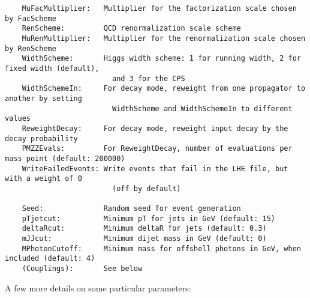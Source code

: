 \documentclass[aps,superscriptaddress,nofootinbib]{revtex4}
\begin{document}
\begin{verbatim}
    MuFacMultiplier:   Multiplier for the factorization scale chosen by FacScheme
    RenScheme:         QCD renormalization scale scheme
    MuRenMultiplier:   Multiplier for the renormalization scale chosen by RenScheme
    WidthScheme:       Higgs width scheme: 1 for running width, 2 for fixed width (default),
                         and 3 for the CPS
    WidthSchemeIn:     For decay mode, reweight from one propagator to another by setting
                         WidthScheme and WidthSchemeIn to different values
    ReweightDecay:     For decay mode, reweight input decay by the decay probability
    PMZZEvals:         For ReweightDecay, number of evaluations per mass point (default: 200000)
    WriteFailedEvents: Write events that fail in the LHE file, but with a weight of 0
                         (off by default)

    Seed:              Random seed for event generation
    pTjetcut:          Minimum pT for jets in GeV (default: 15)
    deltaRcut:         Minimum deltaR for jets (default: 0.3)
    mJJcut:            Minimum dijet mass in GeV (default: 0)
    MPhotonCutoff:     Minimum mass for offshell photons in GeV, when included (default: 4)
    (Couplings):       See below
\end{verbatim}

\noindent
A few more details on some particular parameters:
\end{document}
